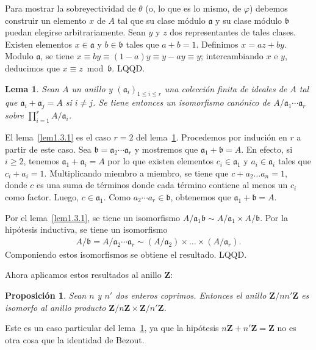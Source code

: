 \documentclass[bibtotoc,leqno,spanish]{amsbook}
\newcommand{\ZZ}{\mathbf{Z}}
\newcommand{\idl}[1]{\mathfrak{#1}}
\newcommand{\QED}{LQQD.}
\numberwithin{equation}{section}
\theoremstyle{note}
\theoremstyle{note}
\newtheorem{proposition}{Proposici\'on}
\newtheorem{lemma}{Lema}
\theoremstyle{rem}
\numberwithin{theorem}{section}
\numberwithin{proposition}{section}
\numberwithin{definition}{section}
\numberwithin{lemma}{section}
\numberwithin{corollary}{section}
\numberwithin{example}{section}
\numberwithin{footnote}{section}%
\begin{document}
Para mostrar la sobreyectividad de $\theta$ (o, lo que es lo mismo, de $\varphi$) debemos construir
un elemento $x$ de $A$ tal que su clase m\'odulo $\idl{a}$ y su clase m\'odulo $\idl{b}$ puedan
elegirse arbitrariamente. Sean $y$ y $z$ dos representantes de tales clases. Existen elementos
$x\in\idl{a}$ y $b\in\idl{b}$ tales que $a+b=1$. Definimos $x = az+by$. Modulo $\idl{a}$,
se tiene $x\equiv by\equiv (1-a)y\equiv y-ay\equiv y$; intercambiando $x$ e $y$, deducimos
que $x\equiv z\bmod\idl{b}$. \QED

\begin{lemma}\label{lem1.3.2}
Sean $A$ un anillo y $(\idl{a}_{i})_{1\leq i\leq r}$ una colecci\'on finita de ideales de $A$
tal que $\idl{a}_{i}+\idl{a}_{j} = A$ si $i\neq j$. Se tiene entonces un isomorfismo can\'onico
de $A/\idl{a}_{1}\cdots\idl{a}_{r}$ sobre $\prod_{i=1}^{r}A/\idl{a}_{i}$.
\end{lemma}

El lema~\ref{lem1.3.1} es el caso $r=2$ del lema~\ref{lem1.3.2}. Procedemos por induci\'on en $r$ a partir de este
caso. Sea $\idl{b} = \idl{a}_{2}\cdots\idl{a}_{r}$ y mostremos que $\idl{a}_{1}+\idl{b}=A$.
En efecto, si $i\geq 2$, tenemos $\idl{a}_{1}+\idl{a}_{i} = A$ por lo que existen
elementos $c_{i}\in\idl{a}_{1}$ y $a_{i}\in\idl{a}_{i}$ tales que $c_{i}+a_{i} = 1$. Multiplicando
miembro a miembro, se tiene que $c+a_{2}\dots a_{n} = 1$, donde $c$ es una suma de t\'erminos
donde cada t\'ermino contiene al menos un $c_{i}$ como factor. Luego, $c\in\idl{a}_{1}$. Como
$a_{2}\cdots a_{r}\in\idl{b}$, obtenemos que $\idl{a}_{1}+\idl{b} =A$.

Por el lema~\ref{lem1.3.1}, se tiene un isomorfismo
$A/\idl{a}_{1}\idl{b}\sim A/\idl{a}_{1}\times A/\idl{b}$.
Por la hip\'otesis inductiva, se tiene un isomorfismo
\begin{gather*}
A/\idl{b} = A/\idl{a}_{2}\cdots\idl{a}_{r}\sim (A/\idl{a}_{2})\times\dots\times(A/\idl{a}_{r}).
\end{gather*}
Componiendo estos isomorfismos se obtiene el resultado. \QED

Ahora aplicamos estos resultados al anillo $\ZZ$:

\begin{proposition}
Sean $n$ y $n'$ dos enteros coprimos. Entonces el anillo $\ZZ/nn'\ZZ$ es isomorfo al anillo
producto $\ZZ/n\ZZ\times\ZZ/n'\ZZ$.
\end{proposition}

Este es un caso particular del lema~\ref{lem1.3.2}, ya que la hip\'otesis $n\ZZ+n'\ZZ=\ZZ$
no es otra cosa que la identidad de Bezout.
\end{document}
